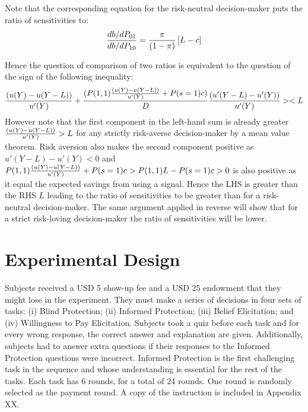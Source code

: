 \documentclass[12pt,a4paper]{article}
\begin{document}
Note that the corresponding equation for the risk-neutral decision-maker puts the ratio of sensitivities to:
\[{db/dP_{01} \over db/dP_{10}}= {\pi \over (1-\pi)} \left[L-c \right] \]

Hence the question of comparison of two ratios is equivalent to the question of the sign of the following inequality:
\[{(u(Y)-u(Y-L)) \over u'(Y)}+{(P(1,1){(u(Y)-u(Y-L)) \over u'(Y)}+P(s=1)c) \over D}{(u'(Y-L)-u'(Y))\over u'(Y)}><L\]
However note that the first component in the left-hand sum is already greater ${(u(Y)-u(Y-L)) \over u'(Y)}>L$ for any strictly risk-averse decision-maker by a mean value theorem. Risk aversion also makes the second component positive as  $u'(Y-L)-u'(Y)<0$ and $P(1,1){(u(Y)-u(Y-L)) \over u'(Y)}+P(s=1)c>P(1,1)L-P(s=1)c>0$ is also positive as it equal the expected savings from using a signal. Hence the LHS is greater than the RHS $L$ leading to the ratio of sensitivities to be greater than for a risk-neutral decision-maker. The same argument applied in reverse will show that for a strict risk-loving decision-maker the ratio of sensitivities will be lower. 


%




\vspace{20pt}

\section{Experimental Design}

Subjects received a USD 5 show-up fee and a USD 25 endowment that they might lose in the experiment. They must make a series of decisions in four sets of tasks: (i) Blind Protection; (ii) Informed Protection; (iii) Belief Elicitation; and (iv) Willingness to Pay Elicitation. Subjects took a quiz before each task and for every wrong response, the correct answer and explanation are given. Additionally, subjects had to answer extra questions if their responses to the Informed Protection questions were incorrect. Informed Protection is the first challenging task in the sequence and whose understanding is essential for the rest of the tasks.
Each task has 6 rounds, for a total of 24 rounds. One round is randomly selected as the payment round. A copy of the instruction is included in Appendix XX.
\end{document}
